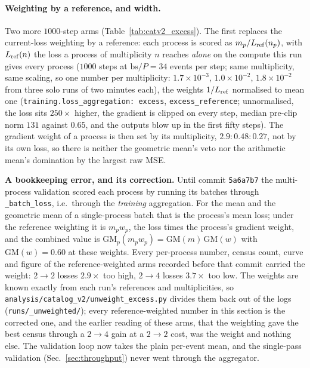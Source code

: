 \documentclass[11pt]{article}
\newcommand{\code}[1]{\texttt{#1}}
\begin{document}
\paragraph{Weighting by a reference, and width.} Two more $1000$-step arms
(Table~\ref{tab:catv2_excess}). The first replaces the current-loss weighting by a
reference: each process is scored as $m_p/L_{\rm ref}(n_p)$, with $L_{\rm ref}(n)$ the loss a
process of multiplicity $n$ reaches \emph{alone} on the compute this run gives every process
($1000$ steps at $\mathrm{bs}/P=34$ events per step; same multiplicity, same scaling, so one
number per multiplicity: $1.7\times10^{-3}$, $1.0\times10^{-2}$, $1.8\times10^{-2}$ from three
solo runs of two minutes each), the weights $1/L_{\rm ref}$ normalised to mean one
(\code{training.loss\_aggregation: excess}, \code{excess\_reference}; unnormalised, the loss
sits $250\times$ higher, the gradient is clipped on every step, median pre-clip norm $131$
against $0.65$, and the outputs blow up in the first fifty steps). The gradient weight of a
process is then set by its multiplicity, $2.9:0.48:0.27$, not by its own loss, so there is
neither the geometric mean's veto nor the arithmetic mean's domination by the largest raw
MSE.

\textbf{A bookkeeping error, and its correction.} Until commit \code{5a6a7b7} the
multi-process validation scored each process by running its batches through
\code{\_batch\_loss}, i.e.\ through the \emph{training} aggregation. For the mean and the
geometric mean of a single-process batch that is the process's mean loss; under the
reference weighting it is $m_p w_p$, the loss times the process's gradient weight, and the
combined value is $\mathrm{GM}_p(m_p w_p)=\mathrm{GM}(m)\,\mathrm{GM}(w)$ with
$\mathrm{GM}(w)=0.60$ at these weights. Every per-process number, census count, curve and
figure of the reference-weighted arms recorded before that commit carried the weight:
$2\to2$ losses $2.9\times$ too high, $2\to4$ losses $3.7\times$ too low. The weights are
known exactly from each run's references and multiplicities, so
\code{analysis/catalog\_v2/unweight\_excess.py} divides them back out of the logs
(\code{runs/\_unweighted/}); every reference-weighted number in this section is the corrected
one, and the earlier reading of these arms, that the weighting gave the best census through
a $2\to4$ gain at a $2\to2$ cost, was the weight and nothing else. The validation loop now
takes the plain per-event mean, and the single-pass validation
(Sec.~\ref{sec:throughput}) never went through the aggregator.
\end{document}
